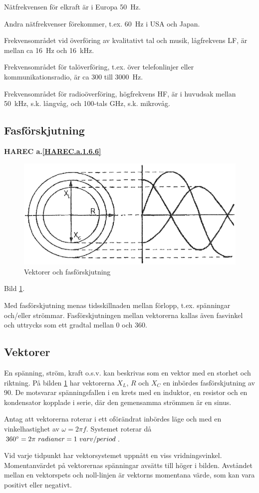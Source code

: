 Nätfrekvensen för elkraft är i Europa 50~Hz.

Andra nätfrekvenser förekommer, t.ex. 60~Hz i USA och Japan.

Frekvensområdet vid överföring av kvalitativt tal och musik, lågfrekvens LF, är
mellan ca 16~Hz och 16~kHz.

Frekvensområdet för talöverföring, t.ex. över telefonlinjer eller
kommunikationsradio, är ca 300 till 3000~Hz.

Frekvensområdet för radioöverföring, högfrekvens HF, är i huvudsak mellan
50~kHz, s.k. långvåg, och 100-tals GHz, s.k. mikrovåg.

\subsection{Fasförskjutning}
\textbf{HAREC a.\ref{HAREC.a.1.6.6}\label{myHAREC.a.1.6.6}}

\begin{figure}[h]
\includegraphics[width=\textwidth]{images/cropped_pdfs/bild_2_1-17.pdf}
\caption{Vektorer och fasförskjutning}
\label{fig:BildII1-17}
\end{figure}

Bild \ref{fig:BildII1-17}.

Med fasförskjutning menas tidsskillnaden mellan förlopp, t.ex. spänningar
och/eller strömmar. Fasförskjutningen mellan vektorerna kallas även fasvinkel
och uttrycks som ett gradtal mellan 0 och 360\degree.

\subsection{Vektorer}

En spänning, ström, kraft o.s.v. kan beskrivas som en vektor med en storhet och
riktning. På bilden \ref{fig:BildII1-17} har vektorerna \(X_L\), \(R\)
och \(X_C\) en inbördes fasförskjutning av 90\degree. De motsvarar spänningsfallen i
en krets med en induktor, en resistor och en kondensator kopplade i serie,
där den gemensamma strömmen är en sinus.

Antag att vektorerna roterar i ett oförändrat inbördes läge och med en
vinkelhastighet av \(\omega= 2\pi f\). Systemet roterar då
\(360\degree = 2\pi\ radianer = 1\ varv/period\).

Vid varje tidpunkt har vektorsystemet uppnått en viss vridningsvinkel.
Momentanvärdet på vektorernas spänningar avsätts till höger i bilden. Avståndet
mellan en vektorspets och noll-linjen är vektorns momentana värde, som kan vara
positivt eller negativt.
